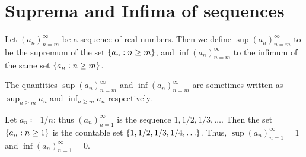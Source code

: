 \section{Suprema and Infima of sequences}\label{i:sec:6.3}

\begin{defn}\label{i:6.3.1}
  Let \((a_n)_{n = m}^\infty\) be a sequence of real numbers.
  Then we define \(\sup(a_n)_{n = m}^\infty\) to be the supremum of the set \(\left\lbrace a_n : n \geq m\right\rbrace\), and \(\inf(a_n)_{n = m}^\infty\) to the infimum of the same set \(\left\lbrace a_n : n \geq m\right\rbrace\).
\end{defn}

\begin{rmk}\label{i:6.3.2}
  The quantities \(\sup(a_n)_{n = m}^\infty\) and \(\inf(a_n)_{n = m}^\infty\) are sometimes written as \(\sup_{n \geq m} a_n\) and \(\inf_{n \geq m} a_n\) respectively.
\end{rmk}

\setcounter{thm}{3}
\begin{eg}\label{i:6.3.4}
  Let \(a_n \coloneqq 1 / n\);
  thus \((a_n)_{n = 1}^\infty\) is the sequence \(1, 1 / 2, 1 / 3, \dots\).
  Then the set \(\left\lbrace a_n : n \geq 1\right\rbrace\) is the countable set \(\set{1, 1 / 2, 1 / 3, 1 / 4, \dots}\).
  Thus, \(\sup(a_n)_{n = 1}^\infty = 1\) and \(\inf(a_n)_{n = 1}^\infty = 0\).
\end{eg}

